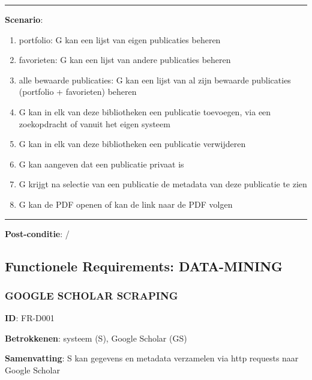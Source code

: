 \hrule
\vspace{2 mm}
\noindent \textbf{Scenario}:
\begin{enumerate}
\item portfolio: G kan een lijst van eigen publicaties beheren 
\item favorieten: G kan een lijst van andere publicaties beheren 
\item alle bewaarde publicaties: G kan een lijst van al zijn bewaarde publicaties (portfolio + favorieten) beheren 
\item G kan in elk van deze bibliotheken een publicatie toevoegen, via een zoekopdracht of vanuit het eigen systeem 
\item G kan in elk van deze bibliotheken een publicatie verwijderen 
\item G kan aangeven dat een publicatie privaat is 
\item G krijgt na selectie van een publicatie de metadata van deze publicatie te zien
\item G kan de PDF openen of kan de link naar de PDF volgen 
\end{enumerate}

\vspace{2 mm}
\hrule
\vspace{4 mm}


\noindent \textbf{Post-conditie}: / \\




\clearpage




\subsection{Functionele Requirements: DATA-MINING}
\vspace{4 mm}


\subsubsection{GOOGLE SCHOLAR SCRAPING}
\vspace{2 mm}

\textbf{ID}: FR-D001
\vspace{2 mm}

\noindent \textbf{Betrokkenen}: systeem (S), Google Scholar (GS)
\vspace{2 mm}

\noindent \textbf{Samenvatting}: S kan gegevens en metadata verzamelen via http requests naar Google Scholar  
\vspace{2 mm}

